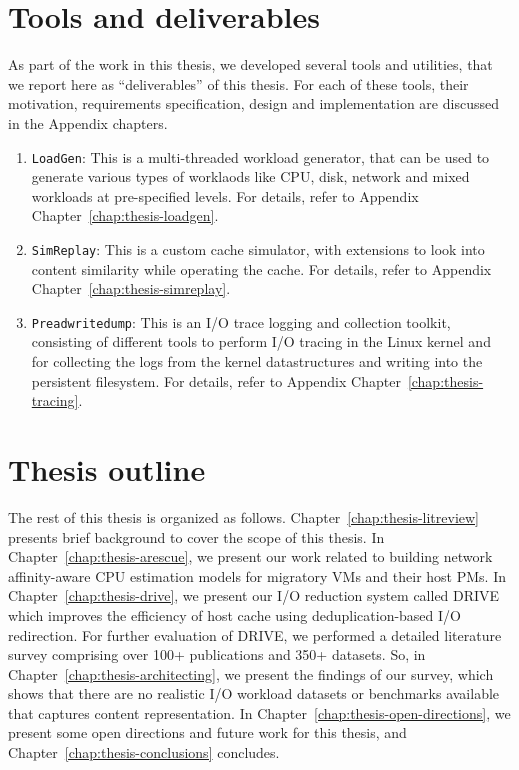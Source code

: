 \section{Tools and deliverables}
As part of the work in this thesis, we developed several tools and utilities,
that we report here as ``deliverables'' of this thesis. For each of these
tools, their motivation, requirements specification, design and 
implementation are discussed in the Appendix chapters.
\begin{enumerate}
	\item \texttt{LoadGen}: This is a multi-threaded workload generator, 
		that can be used to generate various types of worklaods like
		CPU, disk, network and mixed workloads at pre-specified levels.
		For details, refer to Appendix Chapter~\ref{chap:thesis-loadgen}.
	\item \texttt{SimReplay}: This is a custom cache simulator, with 
		extensions to look into content similarity while operating 
		the cache. For details, refer to Appendix 
		Chapter~\ref{chap:thesis-simreplay}.
	\item \texttt{Preadwritedump}: This is an I/O trace logging and
		collection toolkit, consisting of different tools to perform
		I/O tracing in the Linux kernel and for collecting the logs
		from the kernel datastructures and writing 
		into the persistent filesystem. For details, refer to Appendix 
        Chapter~\ref{chap:thesis-tracing}.
\end{enumerate}

\section{Thesis outline}
The rest of this thesis is organized as follows. 
Chapter~\ref{chap:thesis-litreview} presents brief background 
to cover the scope of this thesis.
In Chapter~\ref{chap:thesis-arescue}, we present our work
related to building network affinity-aware CPU estimation models 
for migratory VMs and their host PMs. In Chapter~\ref{chap:thesis-drive},
we present our I/O reduction system called DRIVE which
improves the efficiency of host cache using deduplication-based
I/O redirection. For further evaluation of DRIVE, we 
performed a detailed literature survey comprising over 100+
publications and 350+ datasets. So, in 
Chapter~\ref{chap:thesis-architecting},
we present the findings of our survey, 
which shows that there are no realistic I/O workload datasets 
or benchmarks available that captures content representation.
In Chapter~\ref{chap:thesis-open-directions}, we present
some open directions and future work for this thesis,
and Chapter~\ref{chap:thesis-conclusions} concludes.

